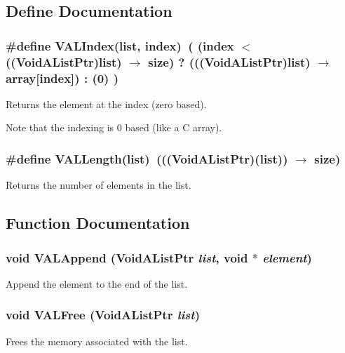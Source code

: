\subsection{Define Documentation}
\subsubsection{\setlength{\rightskip}{0pt plus 5cm}\#define VALIndex(list, index)\ ( (index $<$ ((Void\-AList\-Ptr)list) $\rightarrow$ size) ? (((Void\-AList\-Ptr)list) $\rightarrow$ array[index]) : (0) )}\label{lists_8h_a14}


Returns the element at the index (zero based). 

Note that the indexing is 0 based (like a C array). 
\subsubsection{\setlength{\rightskip}{0pt plus 5cm}\#define VALLength(list)\ (((Void\-AList\-Ptr)(list)) $\rightarrow$ size)}\label{lists_8h_a13}


Returns the number of elements in the list. 



\subsection{Function Documentation}
\subsubsection{\setlength{\rightskip}{0pt plus 5cm}void VALAppend (Void\-AList\-Ptr {\em list}, void $\ast$ {\em element})}\label{lists_8h_a48}


Append the element to the end of the list. 

\subsubsection{\setlength{\rightskip}{0pt plus 5cm}void VALFree (Void\-AList\-Ptr {\em list})}\label{lists_8h_a54}


Frees the memory associated with the list. 

